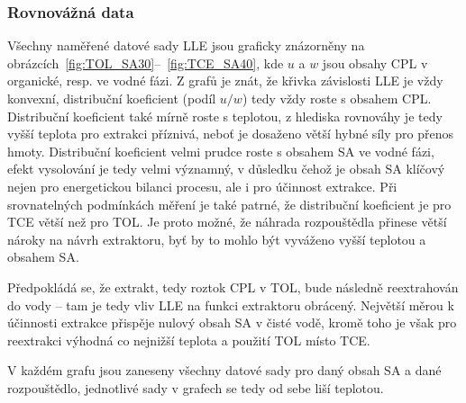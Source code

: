 \subsubsection{Rovnovážná data} \label{resLLE}
Všechny naměřené datové sady LLE jsou graficky znázorněny na obrázcích~\ref{fig:TOL_SA30}--~\ref{fig:TCE_SA40}, kde $u$ a $w$ jsou obsahy CPL v organické, resp. ve vodné fázi.
Z grafů je znát, že křivka závislosti LLE je vždy konvexní, distribuční koeficient (podíl $u/w$) tedy vždy roste s obsahem CPL.
Distribuční koeficient také mírně roste s teplotou, z hlediska rovnováhy je tedy vyšší teplota pro extrakci příznivá, neboť je dosaženo větší hybné síly pro přenos hmoty.
Distribuční koeficient velmi prudce roste s obsahem SA ve vodné fázi, efekt vysolování je tedy velmi významný, v důsledku čehož je obsah SA klíčový nejen pro energetickou bilanci procesu, ale i pro účinnost extrakce.
Při srovnatelných podmínkách měření je také patrné, že distribuční koeficient je pro TCE větší než pro TOL.
Je proto možné, že náhrada rozpouštědla přinese větší nároky na návrh extraktoru, byť by to mohlo být vyváženo vyšší teplotou a obsahem SA.

Předpokládá se, že extrakt, tedy roztok CPL v TOL, bude následně reextrahován do vody -- tam je tedy vliv LLE na funkci extraktoru obrácený.
Největší měrou k účinnosti extrakce přispěje nulový obsah SA v čisté vodě, kromě toho je však pro reextrakci výhodná co nejnižší teplota a použití TOL místo TCE.

V každém grafu jsou zaneseny všechny datové sady pro daný obsah SA a dané rozpouštědlo, jednotlivé sady v grafech se tedy od sebe liší teplotou.


